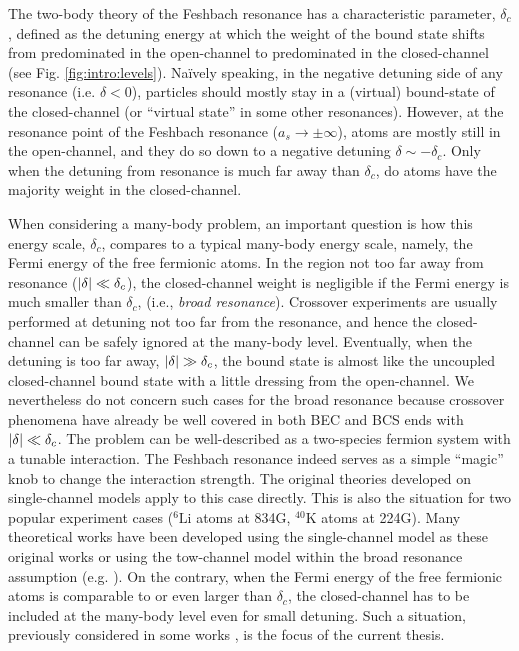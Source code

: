   The two-body theory of the Feshbach resonance has a characteristic  parameter, $\delta_c$, defined as  the detuning energy at which the weight of the bound state shifts from predominated in the open-channel to predominated in the closed-channel (see Fig. \ref{fig:intro:levels}).  Na\"{i}vely speaking, in the negative detuning side of any resonance (i.e. $\delta<0$), particles should mostly stay  in a (virtual) bound-state of the closed-channel (or ``virtual state'' in some other resonances).  However, at the resonance point  of the Feshbach resonance ($a_s\to\pm\infty$), atoms are mostly still in the open-channel, and they do so down to a negative detuning $\delta\sim-\delta_c$. Only when the detuning from resonance is much far away than $\delta_c$, do atoms have the majority weight in the closed-channel.    
  
  When considering a many-body problem, an important question is how this energy scale, $\delta_c$, compares to a typical many-body energy scale, namely, the Fermi energy of the free fermionic atoms. In the region not too far away from resonance ($\left\lvert{\delta}\right\rvert\ll\delta_{c}$), the closed-channel weight is negligible if the Fermi energy is much smaller than $\delta_c$, (i.e., \emph{broad resonance}).  Crossover experiments are usually performed at detuning not too far from the resonance, and hence the closed-channel can be safely ignored at the many-body level. Eventually, when the detuning is too far away, $\left\lvert{\delta}\right\rvert\gg\delta_{c}$, the bound state is almost like the    uncoupled closed-channel bound state with a little dressing from the open-channel.  We nevertheless do not concern such cases for the broad resonance because crossover phenomena have already be well covered in both BEC and BCS ends with $\left\lvert{\delta}\right\rvert\ll\delta_{c}$. The problem can be well-described as a two-species fermion system with a tunable interaction.  The Feshbach resonance indeed serves as a simple ``magic'' knob to change the interaction strength.  The original  theories developed on  single-channel models  apply to this case directly.  This is also the situation for two  popular experiment cases (${}^{6}\text{Li}$ atoms at 834G, $^{40}\text{K}$ atoms at 224G).   Many theoretical works have been developed using the single-channel model as these original works or using the tow-channel model within the broad resonance assumption (e.g. \cite{Holland01,HoUniversal,Fuchs04}). On the contrary, when the Fermi energy of the free fermionic atoms is  comparable to or even larger than $\delta_c$, the closed-channel has to be included at the many-body level even for small detuning. Such a situation, previously considered in some works \cite{GurarieNarrow}, is the focus of the current thesis. 
  
